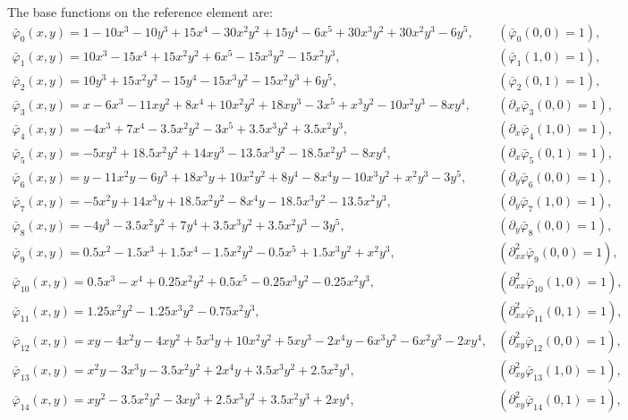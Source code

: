 \documentclass[11pt,a4paper]{article}
\begin{document}
The base functions on the reference element are:
$$ \begin{array}{ll}
\bar{\varphi}_{0}(x,y) = 1 - 10x^3 - 10y^3 + 15x^4 - 30x^2y^2 + 15y^4 - 6x^5 + 30x^3y^2 + 30x^2y^3 - 6y^5, & (\bar{\varphi}_0(0,0) = 1), \\
\bar{\varphi}_{1}(x,y) = 10x^3 - 15x^4 + 15x^2y^2 + 6x^5 - 15x^3y^2 - 15x^2y^3, & (\bar{\varphi}_1(1,0) = 1),\\
\bar{\varphi}_{2}(x,y) = 10y^3 + 15x^2y^2 - 15y^4 - 15x^3y^2 - 15x^2y^3 + 6y^5, & (\bar{\varphi}_2(0,1) = 1),\\
\bar{\varphi}_{3}(x,y) = x - 6x^3 - 11xy^2 + 8x^4 + 10x^2y^2 + 18xy^3 - 3x^5 + x^3y^2 - 10x^2y^3 - 8xy^4, & (\partial_x\bar{\varphi}_3(0,0) = 1),\\
\bar{\varphi}_{4}(x,y) = -4x^3 + 7x^4 - 3.5x^2y^2 - 3x^5 + 3.5x^3y^2 + 3.5x^2y^3, & (\partial_x\bar{\varphi}_4(1,0) = 1),\\
\bar{\varphi}_{5}(x,y) = -5xy^2 + 18.5x^2y^2 + 14xy^3 - 13.5x^3y^2 - 18.5x^2y^3 - 8xy^4, & (\partial_x\bar{\varphi}_5(0,1) = 1),\\
\bar{\varphi}_{6}(x,y) = y - 11x^2y - 6y^3 + 18x^3y + 10x^2y^2 + 8y^4 - 8x^4y - 10x^3y^2 + x^2y^3 - 3y^5, & (\partial_y\bar{\varphi}_6(0,0) = 1),\\
\bar{\varphi}_{7}(x,y) = -5x^2y + 14x^3y + 18.5x^2y^2 - 8x^4y - 18.5x^3y^2 - 13.5x^2y^3, & (\partial_y\bar{\varphi}_7(1,0) = 1),\\
\bar{\varphi}_{8}(x,y) = -4y^3 - 3.5x^2y^2 + 7y^4 + 3.5x^3y^2 + 3.5x^2y^3 - 3y^5, & (\partial_y\bar{\varphi}_8(0,0) = 1),\\
\bar{\varphi}_{9}(x,y) = 0.5x^2 - 1.5x^3 + 1.5x^4 - 1.5x^2y^2 - 0.5x^5 + 1.5x^3y^2 + x^2y^3, & (\partial^2_{xx}\bar{\varphi}_9(0,0) = 1),\\
\bar{\varphi}_{10}(x,y) = 0.5x^3 - x^4 + 0.25x^2y^2 + 0.5x^5 - 0.25x^3y^2 - 0.25x^2y^3, & (\partial^2_{xx}\bar{\varphi}_{10}(1,0) = 1),\\
\bar{\varphi}_{11}(x,y) = 1.25x^2y^2 - 1.25x^3y^2 - 0.75x^2y^3, & (\partial^2_{xx}\bar{\varphi}_{11}(0,1) = 1),\\
\bar{\varphi}_{12}(x,y) = xy - 4x^2y - 4xy^2 + 5x^3y + 10x^2y^2 + 5xy^3 - 2x^4y - 6x^3y^2 - 6x^2y^3 - 2xy^4, & (\partial^2_{xy}\bar{\varphi}_{12}(0,0) = 1),\\
\bar{\varphi}_{13}(x,y) = x^2y - 3x^3y - 3.5x^2y^2 + 2x^4y + 3.5x^3y^2 + 2.5x^2y^3, & (\partial^2_{xy}\bar{\varphi}_{13}(1,0) = 1),\\
\bar{\varphi}_{14}(x,y) = xy^2 - 3.5x^2y^2 - 3xy^3 + 2.5x^3y^2 + 3.5x^2y^3 + 2xy^4, & (\partial^2_{xy}\bar{\varphi}_{14}(0,1) = 1),\\

\end{array}$$
\end{document}
